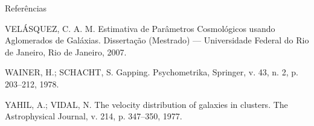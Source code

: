 \documentclass[xcolor=dvipsnames,10pt]{beamer}
\begin{document}
\begin{frame}{Referências}
  \begin{thebibliography}{9}
  \fontsize{8}{0}\selectfont
  VELÁSQUEZ, C. A. M. Estimativa de Parâmetros Cosmológicos usando Aglomerados de Galáxias. Dissertação (Mestrado) — Universidade Federal do Rio de Janeiro, Rio de Janeiro, 2007.

  WAINER, H.; SCHACHT, S. Gapping. Psychometrika, Springer, v. 43, n. 2, p. 203–212, 1978.

  YAHIL, A.; VIDAL, N. The velocity distribution of galaxies in clusters. The Astrophysical Journal, v. 214, p. 347–350, 1977.
  \end{thebibliography}
\end{frame}
\end{document}
